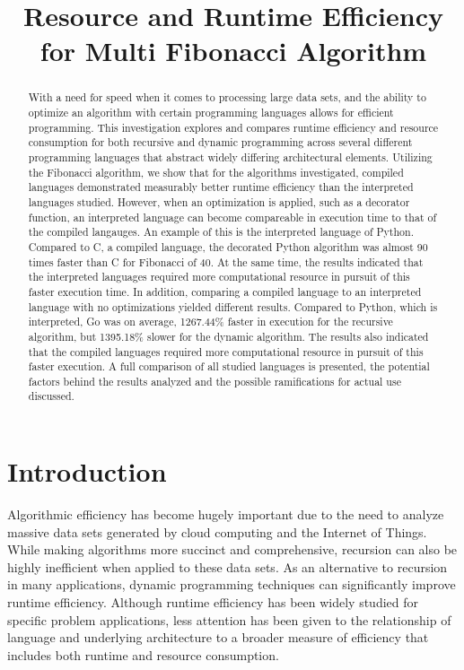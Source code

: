 \documentclass{sig-alternate}
\title{Resource and Runtime Efficiency for Multi Fibonacci Algorithm}
\author{}
\begin{document}
\maketitle
\thispagestyle{firstpage}
\pagestyle{plain}




\begin{abstract}

With a need for speed when it comes to processing large data sets, and the ability to optimize an algorithm with certain programming languages allows for efficient programming. This investigation explores and compares runtime efficiency and resource consumption for both recursive and dynamic programming across several different programming languages that abstract widely differing architectural elements. Utilizing the Fibonacci algorithm, we show that for the algorithms investigated, compiled languages demonstrated measurably better runtime efficiency than the interpreted languages studied. However, when an optimization is applied, such as a decorator function, an interpreted language can become compareable in execution time to that of the compiled langauges. An example of this is the interpreted language of Python. Compared to C, a compiled language, the decorated Python algorithm was almost 90 times faster than C for Fibonacci of 40. At the same time, the results indicated that the interpreted languages required more computational resource in pursuit of this faster execution time. In addition, comparing a compiled language to an interpreted language with no optimizations yielded different results. Compared to Python, which is interpreted, Go was on average, 1267.44\% faster in execution for the recursive algorithm, but 1395.18\% slower for the dynamic algorithm. The results also indicated that the compiled languages required more computational resource in pursuit 
of this faster execution. A full comparison of all studied languages is presented, the potential factors behind the results analyzed and the possible ramifications for actual use discussed.

\end{abstract}

\section{Introduction}
Algorithmic efficiency has become hugely important due to the need to analyze massive data sets generated by cloud computing and the Internet of Things. While making algorithms more succinct and comprehensive, recursion can also be highly inefficient when applied to these data sets. As an alternative to recursion in many applications, dynamic programming techniques can significantly improve runtime efficiency. Although runtime efficiency has been widely studied for specific problem applications, less attention has been given to the relationship of language and underlying architecture to a broader measure of efficiency that includes both runtime and resource consumption.
\end{document}

